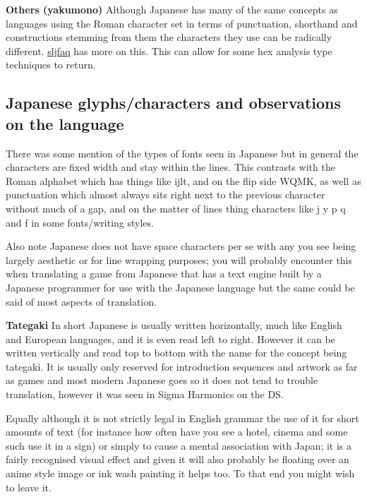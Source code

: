 \documentclass[
]{book}
\begin{document}
\textbf{Others (yakumono)} Although Japanese has many of the same concepts as languages using the Roman character set in terms of punctuation, shorthand and constructions stemming from them the characters they use can be radically different. \href{http://www.sljfaq.org/afaq/symbol.html}{sljfaq} has more on this. This can allow for some hex analysis type techniques to return.

\hypertarget{japanese-glyphscharacters-and-observations-on-the-language}{%
\subsection{Japanese glyphs/characters and observations on the language}\label{japanese-glyphscharacters-and-observations-on-the-language}}

There was some mention of the types of fonts seen in Japanese but in general the characters are fixed width and stay within the lines. This contrasts with the Roman alphabet which has things like ijlt, and on the flip side WQMK, as well as punctuation which almost always sits right next to the previous character without much of a gap, and on the matter of lines thing characters like j y p q and f in some fonts/writing styles.

Also note Japanese does not have space characters per se with any you see being largely aesthetic or for line wrapping purposes; you will probably encounter this when translating a game from Japanese that has a text engine built by a Japanese programmer for use with the Japanese language but the same could be said of most aspects of translation.

\textbf{Tategaki} In short Japanese is usually written horizontally, much like English and European languages, and it is even read left to right. However it can be written vertically and read top to bottom with the name for the concept being tategaki. It is usually only reserved for introduction sequences and artwork as far as games and most modern Japanese goes so it does not tend to trouble translation, however it was seen in Sigma Harmonics on the DS.

Equally although it is not strictly legal in English grammar the use of it for short amounts of text (for instance how often have you see a hotel, cinema and some such use it in a sign) or simply to cause a mental association with Japan; it is a fairly recognised visual effect and given it will also probably be floating over an anime style image or ink wash painting it helps too. To that end you might wish to leave it.
\end{document}
